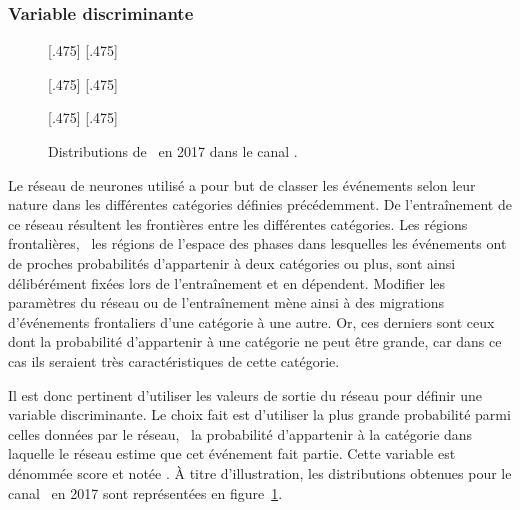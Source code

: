 \subsubsection{Variable discriminante}
\begin{figure}[p]
\centering

[.475\textwidth]
{}
\hfill
{}[.475\textwidth]
{}

[.475\textwidth]
{}
\hfill
{}[.475\textwidth]
{}

[.475\textwidth]
{}
\hfill
{}[.475\textwidth]
{}

\caption[Distributions de \NNscore\ en 2017 dans le canal \ele\mu.]{Distributions de \NNscore\ en 2017 dans le canal \ele\mu.}
\label{fig-NNscore_distribs_exemple}
\end{figure}
Le réseau de neurones utilisé a pour but de classer les événements selon leur nature dans les différentes catégories définies précédemment.
De l'entraînement de ce réseau résultent les frontières entre les différentes catégories.
Les régions frontalières, \ie\ les régions de l'espace des phases dans lesquelles les événements ont de proches probabilités d'appartenir à deux catégories ou plus, sont ainsi délibérément fixées lors de l'entraînement et en dépendent.
Modifier les paramètres du réseau ou de l'entraînement mène ainsi à des migrations d'événements frontaliers d'une catégorie à une autre.
Or, ces derniers sont ceux dont la probabilité d'appartenir à une catégorie ne peut être grande, car dans ce cas ils seraient très caractéristiques de cette catégorie.
\par
Il est donc pertinent d'utiliser les valeurs de sortie du réseau pour définir une variable discriminante.
Le choix fait est d'utiliser la plus grande probabilité parmi celles données par le réseau, \ie\ la probabilité d'appartenir à la catégorie dans laquelle le réseau estime que cet événement fait partie.
Cette variable est dénommée \og score \fg{} et notée \NNscore.
À titre d'illustration, les distributions obtenues pour le canal \ele\mu\ en 2017 sont représentées en figure~\ref{fig-NNscore_distribs_exemple}.
